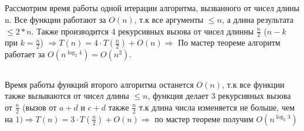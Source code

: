 \documentclass{article}
\begin{document}
\begin{flushleft}
\subsection{}

Рассмотрим время работы одной итерации алгоритма, вызванного от чисел длины n. Все функции работают за $O(n)$, т.к все аргументы $ \le n$, а длина результата $\le 2 * n$. Также производится 4 рекурсивных вызова от чисел длинны $\frac{n}{2}$ ($n - k$ при $k = \frac{n}{2}$) $\Rightarrow T(n) = 4 \cdot T(\frac{n}{2}) + O(n) \Rightarrow$ По мастер теореме алгоритм работает за $O(n^{\log_2{4}}) = O(n^2)$.

\subsection{}

Время работы функций второго алгоритма останется $O(n)$, т.к все функции также вызываются от чисел длины $\le n$, функция делает 3 рекурсивных вызова от $\frac{n}{2}$ (вызов от $a + d$ и $c + d$ также $\frac{n}{2}$ т.к длина числа изменяется не больше, чем на $1) \Rightarrow T(n) = 3 \cdot T(\frac{n}{2}) + O(n) \Rightarrow$ по мастер теореме получим $O(n^{\log_2{3}})$
\end{flushleft}
\end{document}

